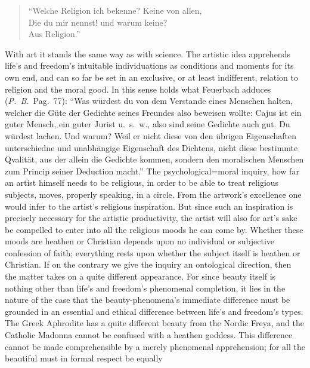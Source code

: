 \documentclass[12pt]{book}
\begin{document}
\begin{verse}
\small
``Welche Religion ich bekenne? Keine von allen,\\
Die du mir nennst! und warum keine?\\
\hspace*{4em}Aus Religion.''
\end{verse}

With art it stands the same way as with science. The artistic idea
apprehends life's and freedom's intuitable individuations as conditions and
moments for its own end, and can so far be set in an exclusive, or at least
indifferent, relation to religion and the moral good. In this sense holds
what Feuerbach adduces (\textit{P.\ B.}\ Pag.\ 77): ``Was würdest du von dem
Verstande eines Menschen halten, welcher die Güte der Gedichte seines
Freundes also beweisen wollte: Cajus ist ein guter Mensch, ein guter Jurist
u.\ s.\ w., also sind seine Gedichte auch gut. Du würdest lachen. Und warum?
Weil er nicht diese von den übrigen Eigenschaften unterschiedne und
unabhängige Eigenschaft des Dichtens, nicht diese bestimmte Qvalität, aus
der allein die Gedichte kommen, sondern den moralischen Menschen zum Princip
seiner Deduction macht.'' The psychological=moral inquiry, how far an artist
himself needs to be religious, in order to be able to treat religious
subjects, moves, properly speaking, in a circle. From the artwork's
excellence one would infer to the artist's religious inspiration. But since
such an inspiration is precisely necessary for the artistic productivity,
the artist will also for art's sake be compelled to enter into all the
religious moods he can come by. Whether these moods are heathen or Christian
depends upon no individual or subjective confession of faith; everything
rests upon whether the subject itself is heathen or Christian. If on the
contrary we give the inquiry an ontological direction, then the matter takes
on a quite different appearance. For since beauty itself is nothing other
than life's and freedom's phenomenal completion, it lies in the nature of
the case that the beauty-phenomena's immediate difference must be grounded
in an essential and ethical difference between life's and freedom's types.
The Greek Aphrodite has a quite different beauty from the Nordic Freya, and
the Catholic Madonna cannot be confused with a heathen goddess. This
difference cannot be made comprehensible by a merely phenomenal
apprehension; for all the beautiful must in formal respect be equally
\end{document}
